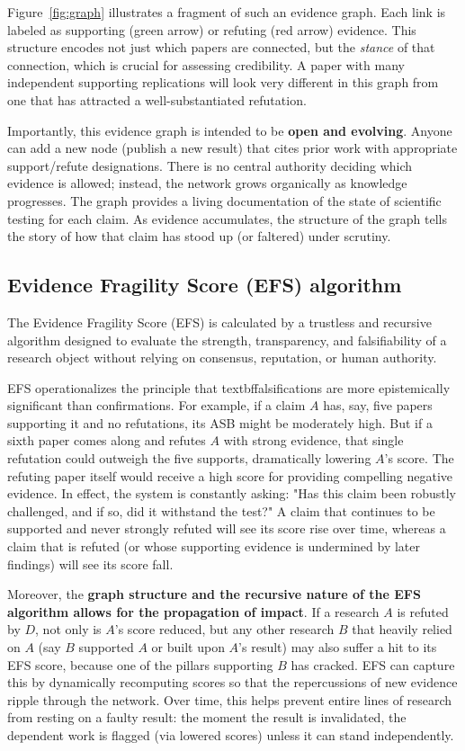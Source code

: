 Figure~\ref{fig:graph} illustrates a fragment of such an evidence graph. Each link is labeled as supporting (green arrow) or refuting (red arrow) evidence. This structure encodes not just which papers are connected, but the \emph{stance} of that connection, which is crucial for assessing credibility. A paper with many independent supporting replications will look very different in this graph from one that has attracted a well-substantiated refutation.

Importantly, this evidence graph is intended to be \textbf{open and evolving}. Anyone can add a new node (publish a new result) that cites prior work with appropriate support/refute designations. There is no central authority deciding which evidence is allowed; instead, the network grows organically as knowledge progresses. The graph provides a living documentation of the state of scientific testing for each claim. As evidence accumulates, the structure of the graph tells the story of how that claim has stood up (or faltered) under scrutiny.



\subsection{Evidence Fragility Score (EFS) algorithm}
The Evidence Fragility Score (EFS) is calculated by a trustless and recursive algorithm designed to evaluate the strength, transparency, and falsifiability of a research object without relying on consensus, reputation, or human authority.

EFS operationalizes the principle that textbf{falsifications are more epistemically significant than confirmations}. For example, if a claim $A$ has, say, five papers supporting it and no refutations, its ASB might be moderately high. But if a sixth paper comes along and refutes $A$ with strong evidence, that single refutation could outweigh the five supports, dramatically lowering $A$'s score. The refuting paper itself would receive a high score for providing compelling negative evidence. In effect, the system is constantly asking: "Has this claim been robustly challenged, and if so, did it withstand the test?" A claim that continues to be supported and never strongly refuted will see its score rise over time, whereas a claim that is refuted (or whose supporting evidence is undermined by later findings) will see its score fall.

Moreover, the \textbf{graph structure and the recursive nature of the EFS algorithm allows for the propagation of impact}. If a research $A$ is refuted by $D$, not only is $A$'s score reduced, but any other research $B$ that heavily relied on $A$ (say $B$ supported $A$ or built upon $A$'s result) may also suffer a hit to its EFS score, because one of the pillars supporting $B$ has cracked. EFS can capture this by dynamically recomputing scores so that the repercussions of new evidence ripple through the network. Over time, this helps prevent entire lines of research from resting on a faulty result: the moment the result is invalidated, the dependent work is flagged (via lowered scores) unless it can stand independently. 

